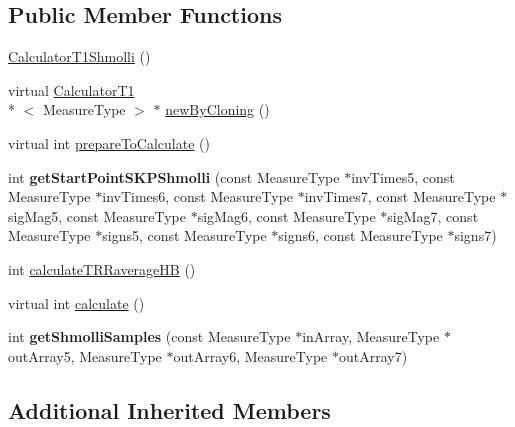 \subsection*{Public Member Functions}
\begin{DoxyCompactItemize}
\item 
\hyperlink{class_ox_1_1_calculator_t1_shmolli_a693169987cfe715b58c7502b306230f5}{Calculator\-T1\-Shmolli} ()
\item 
virtual \hyperlink{class_ox_1_1_calculator_t1}{Calculator\-T1}\\*
$<$ Measure\-Type $>$ $\ast$ \hyperlink{class_ox_1_1_calculator_t1_shmolli_a5fa5fd5685a5566e605a1ee93569ac29}{new\-By\-Cloning} ()
\item 
virtual int \hyperlink{class_ox_1_1_calculator_t1_shmolli_a6464c63f20ecd9de842d722e5d9d2866}{prepare\-To\-Calculate} ()
\item 
\hypertarget{class_ox_1_1_calculator_t1_shmolli_ab44f84d453405c2c61094fc4cd53449c}{int {\bfseries get\-Start\-Point\-S\-K\-P\-Shmolli} (const Measure\-Type $\ast$inv\-Times5, const Measure\-Type $\ast$inv\-Times6, const Measure\-Type $\ast$inv\-Times7, const Measure\-Type $\ast$sig\-Mag5, const Measure\-Type $\ast$sig\-Mag6, const Measure\-Type $\ast$sig\-Mag7, const Measure\-Type $\ast$signs5, const Measure\-Type $\ast$signs6, const Measure\-Type $\ast$signs7)}\label{class_ox_1_1_calculator_t1_shmolli_ab44f84d453405c2c61094fc4cd53449c}

\item 
int \hyperlink{class_ox_1_1_calculator_t1_shmolli_a2c4444b1aa40e3f01b7cf0b8e7f7672b}{calculate\-T\-R\-Raverage\-H\-B} ()
\item 
virtual int \hyperlink{class_ox_1_1_calculator_t1_shmolli_ac689ebbf27f95f6fa2559cc13a824db0}{calculate} ()
\item 
\hypertarget{class_ox_1_1_calculator_t1_shmolli_a5e2d8b626c05aebbf816cb0594295b77}{int {\bfseries get\-Shmolli\-Samples} (const Measure\-Type $\ast$in\-Array, Measure\-Type $\ast$out\-Array5, Measure\-Type $\ast$out\-Array6, Measure\-Type $\ast$out\-Array7)}\label{class_ox_1_1_calculator_t1_shmolli_a5e2d8b626c05aebbf816cb0594295b77}

\end{DoxyCompactItemize}
\subsection*{Additional Inherited Members}


